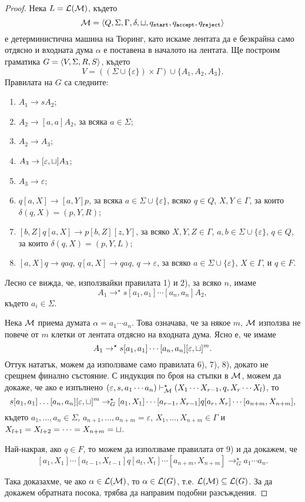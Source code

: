 \begin{proof}
  Нека $L = \mathcal{L}(\mathcal{M})$, където 
  \[\mathcal{M} = \langle{Q,\Sigma,\Gamma,\delta,\sqcup,q_{\texttt{start}},q_{\texttt{accept}}, q_{\texttt{reject}}}\rangle\] е детерминистична машина на Тюринг,
  като искаме лентата да е безкрайна само отдясно и входната дума $\alpha$ е
  поставена в началото на лентата.
  Ще построим граматика $G = \langle{V,\Sigma,R,S}\rangle$, където 
  \[V = ((\Sigma\cup\{\varepsilon\})\times\Gamma) \cup \{A_1,A_2,A_3\}.\]
  Правилата на $G$ са следните:
  \begin{enumerate}[1)]
  \item 
    $A_1 \to sA_2$;
  \item
    $A_2 \to [a,a]A_2$, за всяка $a\in\Sigma$;
  \item
    $A_2 \to A_3$;
  \item
    $A_3 \to [\varepsilon,\sqcup]A_3$;
  \item
    $A_3 \to \varepsilon$;
  \item
    $q[a,X] \to [a,Y]p$, за всяка $a \in \Sigma\cup\{\varepsilon\}$, всяко $q\in Q$, $X,Y \in\Gamma$, 
    за които $\delta(q,X) = (p,Y,R)$;
  \item
    $[b,Z]q[a,X] \to p[b,Z][z,Y]$, за всяко $X,Y,Z \in \Gamma$, $a,b\in\Sigma\cup\{\varepsilon\}$, $q\in Q$,
    за които $\delta(q,X) = (p,Y,L)$;
  \item
    $[a,X]q \to qaq$, $q[a,X] \to qaq$, $q \to \varepsilon$, за всяко $a\in\Sigma\cup\{\varepsilon\}$, $X\in\Gamma$,
    и $q \in F$.
  \end{enumerate}
  
  Лесно се вижда, че, използвайки правилата 1) и 2), за всяко $n$, имаме
  \[A_1 \to^\star s[a_1,a_1]\cdots[a_n,a_n]A_2,\]
  където $a_i \in \Sigma$.

  Нека $\mathcal{M}$ приема думата $\alpha = a_1\cdots a_n$.
  Това означава, че за някое $m$, $\mathcal{M}$ използва не повече от $m$ клетки от лентата отдясно на входната дума.
  Ясно е, че имаме
  \[A_1 \to^\star s[a_1,a_1]\cdots[a_n,a_n][\varepsilon,\sqcup]^m.\]
  Оттук нататък, можем да използваме само правилата 6), 7), 8), докато не срещнем финално състояние.
  С индукция по броя на стъпки в $\mathcal{M}$, можем да докаже, че ако е изпълнено
  $(\varepsilon,s,a_1\cdots a_n) \vdash^\star_{\mathcal{M}} (X_1\cdots X_{r-1},q,X_r\cdots X_l)$, 
  то \[s[a_1,a_1]\dots[a_n,a_n][\varepsilon,\sqcup]^m \rightarrow^\star_G [a_1,X_1]\cdots[a_{r-1},X_{r-1}]q[a_r,X_r]\cdots[a_{n+m},X_{n+m}],\]
  където $a_1,\dots,a_n \in \Sigma$, $a_{n+1},\dots,a_{n+m} = \varepsilon$, $X_1,\dots,X_{n+m} \in \Gamma$ и
  $X_{l+1} = X_{l+2} = \dots = X_{n+m} = \sqcup$.
  
  Най-накрая, ако $q \in F$, то можем да използваме правилата от 9) и да докажем, че
  \[[a_1,X_1]\cdots[a_{t-1},X_{t-1}]q[a_t,X_t]\cdots[a_{n+m},X_{n+m}] \rightarrow^\star_G a_1\cdots a_n.\]
  
  Така доказахме, че ако $\alpha \in \mathcal{L}(\mathcal{M})$, то $\alpha \in \mathcal{L}(G)$, т.е. $\mathcal{L}(\mathcal{M}) \subseteq \mathcal{L}(G)$.
  За да докажем обратната посока, трябва да направим подобни разсъждения.
\end{proof}

